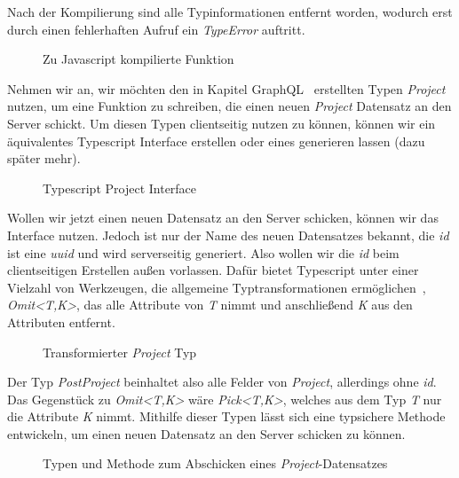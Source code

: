 Nach der Kompilierung sind alle Typinformationen entfernt worden, wodurch erst durch einen fehlerhaften Aufruf
ein \emph{TypeError} auftritt.

\begin{figure}[h]
    
    \caption{Zu Javascript kompilierte Funktion}
    \label{fig:basics:typescript:2}
\end{figure}

Nehmen wir an, wir möchten den in Kapitel GraphQL~ erstellten Typen \emph{Project} nutzen,
um eine Funktion zu schreiben, die einen neuen \emph{Project} Datensatz an den Server schickt. Um diesen Typen clientseitig nutzen zu können,
können wir ein äquivalentes Typescript Interface erstellen oder eines generieren lassen (dazu später mehr).

\begin{figure}[h]
    
    \caption{Typescript Project Interface}
    \label{fig:basics:typescript:3}
\end{figure}

Wollen wir jetzt einen neuen Datensatz an den Server schicken, können wir das Interface nutzen. Jedoch ist nur der Name des neuen Datensatzes bekannt,
die \emph{id} ist eine \emph{uuid} und wird serverseitig generiert. Also wollen wir die \emph{id} beim clientseitigen Erstellen außen vorlassen.
Dafür bietet Typescript unter einer Vielzahl von Werkzeugen, die allgemeine Typtransformationen ermöglichen~\cite{typescript-utility-types},
\emph{Omit<T,K>}, das alle Attribute von \emph{T} nimmt und anschließend \emph{K} aus den Attributen entfernt.

\begin{figure}[h]
    
    \caption{Transformierter \emph{Project} Typ}
    \label{fig:basics:typescript:4}
\end{figure}

Der Typ \emph{PostProject} beinhaltet also alle Felder von \emph{Project}, allerdings ohne \emph{id}. Das Gegenstück zu \emph{Omit<T,K>} wäre \emph{Pick<T,K>},
welches aus dem Typ \emph{T} nur die Attribute \emph{K} nimmt. Mithilfe dieser Typen lässt sich eine typsichere Methode entwickeln,
um einen neuen Datensatz an den Server schicken zu können.

\begin{figure}[h]
    
    \caption{Typen und Methode zum Abschicken eines \emph{Project}-Datensatzes}
    \label{fig:basics:typescript:5}
\end{figure}

